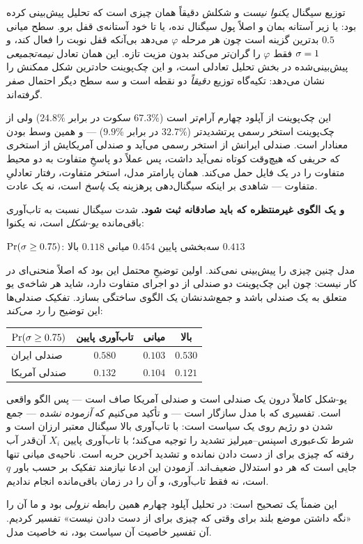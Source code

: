 \documentclass[12pt,a4paper]{article}
\begin{document}
\begin{answer}
توزیع سیگنال \emph{یکنوا نیست} و شکلش دقیقاً همان چیزی است که تحلیل
پیش‌بینی کرده بود: یا زیر آستانه بمان و اصلاً پول سیگنال نده، یا تا خود
آستانه‌ی قفل برو. سطح میانی $0.5$ بدترین گزینه است چون هر مرحله $\varphi$
می‌دهد بی‌آنکه قفل نوبت را فعال کند، و $\sigma=1$ فقط $\varphi$ را گران‌تر
می‌کند بدون مزیت تازه. این همان تعادل \emph{نیمه‌تجمیعی} پیش‌بینی‌شده در
بخش تحلیل تعادلی است، و این چک‌پوینت حادترین شکل ممکنش را نشان می‌دهد:
تکیه‌گاه توزیع \emph{دقیقاً} دو نقطه است و سه سطح دیگر احتمال صفر
گرفته‌اند.

این چک‌پوینت از آپلود چهارم آرام‌تر است ($67.3\%$ سکوت در برابر
$24.8\%$) ولی از چک‌پوینت استخر رسمی پرتشدیدتر ($32.7\%$ در برابر
$9.9\%$) — و همین وسط بودن معنادار است. صندلی ایرانش از استخر رسمی می‌آید
و صندلی آمریکایش از استخری که حریفی که هیچ‌وقت کوتاه نمی‌آید داشت، پس عملاً دو
پاسخِ متفاوت به دو محیط متفاوت را در یک فایل حمل می‌کند. همان پارامتر
مدل، استخر متفاوت، رفتار تعادلیِ متفاوت — شاهدی بر اینکه سیگنال‌دهی
پرهزینه یک \emph{پاسخ} است، نه یک عادت.

\textbf{و یک الگوی غیرمنتظره که باید صادقانه ثبت شود.} شدت سیگنال نسبت
به تاب‌آوری باقی‌مانده \emph{یو-شکل} است، نه یکنوا:

\begin{center}\small
$\Pr(\sigma\ge0.75)$: سه‌بخشی پایین $0.454$ \quad میانی $0.118$ \quad
بالا $0.413$
\end{center}

مدل چنین چیزی را پیش‌بینی نمی‌کند. اولین توضیحِ محتمل این بود که اصلاً
منحنی‌ای در کار نیست: چون این چک‌پوینت دو صندلی از دو اجرای متفاوت دارد،
شاید هر شاخه‌ی یو متعلق به یک صندلی باشد و جمع‌شدنشان یک الگوی ساختگی
بسازد. تفکیک صندلی‌ها این توضیح را \emph{رد می‌کند}:

\begin{center}\small
\begin{tabular}{lccc}
\toprule
$\Pr(\sigma\ge0.75)$ & تاب‌آوری پایین & میانی & بالا\\
\midrule
صندلی ایران   & $\mathbf{0.580}$ & $0.103$ & $\mathbf{0.530}$\\
صندلی آمریکا  & $0.132$ & $0.104$ & $0.121$\\
\bottomrule
\end{tabular}
\end{center}

یو-شکل کاملاً درون یک صندلی است و صندلی آمریکا صاف است — پس الگو
واقعی است. تفسیری که با مدل سازگار است — و تأکید می‌کنیم که
\emph{آزموده نشده} — جمع شدن دو رژیم روی یک سیاست است: با تاب‌آوری بالا
سیگنال معتبر ارزان است و شرط تک‌عبوری اسپنس–میرلیز تشدید را توجیه
می‌کند؛ با تاب‌آوری پایین $X_i$ آن‌قدر آب رفته که چیزی برای از دست دادن
نمانده و تشدید آخرین حربه است. ناحیه‌ی میانی تنها جایی است که هر دو
استدلال ضعیف‌اند. آزمودن این ادعا نیازمند تفکیک بر حسب باور $q$ است، نه
فقط تاب‌آوری، و آن را در زمان باقی‌مانده انجام ندادیم.

این ضمناً یک تصحیح است: در تحلیل آپلود چهارم همین رابطه \emph{نزولی}
بود و ما آن را «نگه داشتن موضع بلند برای وقتی که چیزی برای از دست دادن
نیست» تفسیر کردیم. آن تفسیر خاصیت آن سیاست بود، نه خاصیت مدل.
\end{answer}
\end{document}

